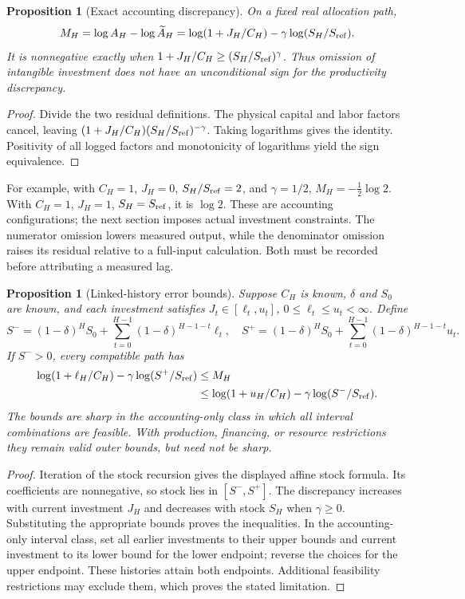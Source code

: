 \documentclass[11pt]{article}
\newtheorem{proposition}[theorem]{Proposition}
\theoremstyle{remark}
\begin{document}
\begin{proposition}[Exact accounting discrepancy]\label{accounting}
On a fixed real allocation path,
\[
 M_H=\log A_H-\log\widetilde A_H
    =\log(1+J_H/C_H)-\gamma\log(S_H/S_{\rm ref}).
\]
It is nonnegative exactly when
$1+J_H/C_H\geq(S_H/S_{\rm ref})^\gamma$. Thus omission of intangible investment does not have an unconditional sign for the productivity discrepancy.
\end{proposition}
\begin{proof}
Divide the two residual definitions. The physical capital and labor factors cancel, leaving $(1+J_H/C_H)(S_H/S_{\rm ref})^{-\gamma}$. Taking logarithms gives the identity. Positivity of all logged factors and monotonicity of logarithms yield the sign equivalence.
\end{proof}

For example, with $C_H=1$, $J_H=0$, $S_H/S_{\rm ref}=2$, and $\gamma=1/2$, $M_H=-\tfrac12\log2$. With $C_H=1$, $J_H=1$, $S_H=S_{\rm ref}$, it is $\log2$. These are accounting configurations; the next section imposes actual investment constraints. The numerator omission lowers measured output, while the denominator omission raises its residual relative to a full-input calculation. Both must be recorded before attributing a measured lag.

\begin{proposition}[Linked-history error bounds]
Suppose $C_H$ is known, $\delta$ and $S_0$ are known, and each investment satisfies $J_t\in[\ell_t,u_t]$, $0\leq\ell_t\leq u_t<\infty$. Define
\[
 S^-=(1-\delta)^HS_0+\sum_{t=0}^{H-1}(1-\delta)^{H-1-t}\ell_t,
 \quad
 S^+=(1-\delta)^HS_0+\sum_{t=0}^{H-1}(1-\delta)^{H-1-t}u_t.
\]
If $S^->0$, every compatible path has
\begin{align*}
 \log(1+\ell_H/C_H)-\gamma\log(S^+/S_{\rm ref})
 &\leq M_H\\
 &\leq\log(1+u_H/C_H)-\gamma\log(S^-/S_{\rm ref}).
\end{align*}
The bounds are sharp in the accounting-only class in which all interval combinations are feasible. With production, financing, or resource restrictions they remain valid outer bounds, but need not be sharp.
\end{proposition}
\begin{proof}
Iteration of the stock recursion gives the displayed affine stock formula. Its coefficients are nonnegative, so stock lies in $[S^-,S^+]$. The discrepancy increases with current investment $J_H$ and decreases with stock $S_H$ when $\gamma\geq0$. Substituting the appropriate bounds proves the inequalities. In the accounting-only interval class, set all earlier investments to their upper bounds and current investment to its lower bound for the lower endpoint; reverse the choices for the upper endpoint. These histories attain both endpoints. Additional feasibility restrictions may exclude them, which proves the stated limitation.
\end{proof}
\end{document}
